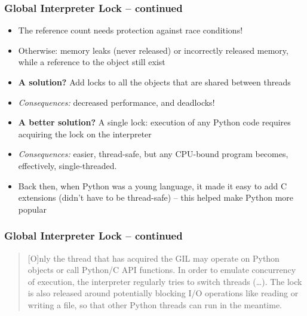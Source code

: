 \documentclass{beamer}
\begin{document}
    \begin{frame}
        \frametitle{Global Interpreter Lock -- continued}
        \begin{itemize}
            \item The reference count needs protection against race conditions!
            \item Otherwise: memory leaks (never released) or incorrectly released memory,
            while a reference to the object still exist
            \item \textbf{A solution?} Add locks to all the objects that are shared between threads
            \item \emph{Consequences:} decreased performance, and deadlocks!
            \item \textbf{A better solution?} A single lock: execution of any Python code
            requires acquiring the lock on the interpreter
            \item \emph{Consequences:} easier, thread-safe, but any CPU-bound program becomes, effectively, single-threaded.
            \item Back then, when Python was a young language, it made it easy to add C extensions
            (didn't have to be thread-safe) -- this helped make Python more popular
        \end{itemize}

    \end{frame}

    \begin{frame}
        \frametitle{Global Interpreter Lock -- continued}

        \begin{quotation}
            [O]nly the thread that has acquired the GIL may operate on Python objects or
            call Python/C API functions. In order to emulate concurrency of execution,
            the interpreter regularly tries to switch threads (\dots).
            The lock is also released around potentially blocking I/O operations like
            reading or writing a file, so that other Python threads can run in the meantime.
        \end{quotation}

    \end{frame}

\end{document}
